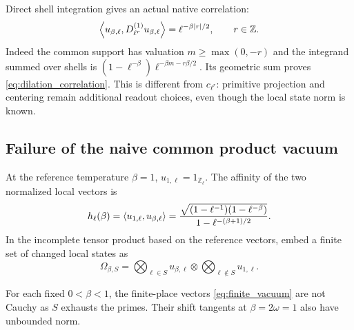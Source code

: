 Direct shell integration gives an actual native correlation:
\begin{equation}
 \left\langle u_{\beta,\ell},D_{\ell^r}^{(1)}u_{\beta,\ell}\right\rangle
 =\ell^{-\beta|r|/2},\qquad r\in\mathbb Z.
 \label{eq:dilation_correlation}
\end{equation}
Indeed the common support has valuation $m\ge\max(0,-r)$ and the
integrand summed over shells is
$(1-\ell^{-\beta})\ell^{-\beta m-r\beta/2}$.
Its geometric sum proves \eqref{eq:dilation_correlation}. This is
different from $c_{\ell^r}$: primitive projection and centering remain
additional readout choices, even though the local state norm is known.

\subsection{Failure of the naive common product vacuum}

At the reference temperature $\beta=1$,
$u_{1,\ell}=1_{\mathbb Z_\ell}$. The affinity of the two normalized
local vectors is
\begin{equation}
 h_\ell(\beta)=\left\langle u_{1,\ell},u_{\beta,\ell}\right\rangle
 =\frac{\sqrt{(1-\ell^{-1})(1-\ell^{-\beta})}}
             {1-\ell^{-(\beta+1)/2}}.
 \label{eq:affinity}
\end{equation}
In the incomplete tensor product based on the reference vectors, embed
a finite set of changed local states as
\begin{equation}
 \Omega_{\beta,S}=\bigotimes_{\ell\in S}u_{\beta,\ell}
                  \otimes\bigotimes_{\ell\notin S}u_{1,\ell}.
 \label{eq:finite_vacuum}
\end{equation}

\begin{proposition}
\label{prop:product_obstruction}
For each fixed $0<\beta<1$, the finite-place vectors
\eqref{eq:finite_vacuum} are not Cauchy as $S$ exhausts the primes.
Their shift tangents at $\beta=2\omega=1$ also have unbounded norm.
\end{proposition}

